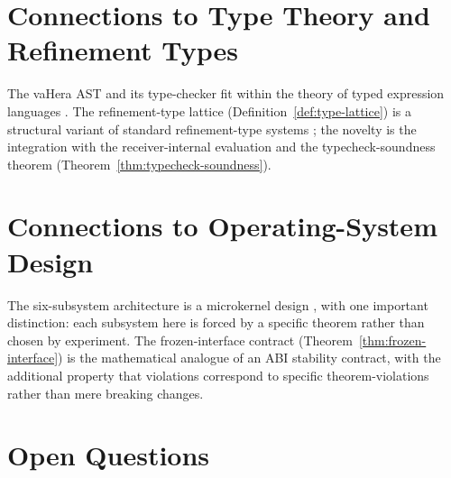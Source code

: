 \documentclass[twocolumn,a4paper]{article}
\begin{document}
\section{Connections to Type Theory and Refinement Types}
\label{sec:type-theory}

The vaHera AST and its type-checker fit within the theory of typed expression languages \citep{pierce2002types,plotkin1977lcf}. The refinement-type lattice (Definition~\ref{def:type-lattice}) is a structural variant of standard refinement-type systems \citep{rondon2008liquid,vazou2014refinement}; the novelty is the integration with the receiver-internal evaluation and the typecheck-soundness theorem (Theorem~\ref{thm:typecheck-soundness}).

\section{Connections to Operating-System Design}
\label{sec:os-design}

The six-subsystem architecture is a microkernel design \citep{liedtke1995microkernel,tanenbaum2014modern}, with one important distinction: each subsystem here is forced by a specific theorem rather than chosen by experiment. The frozen-interface contract (Theorem~\ref{thm:frozen-interface}) is the mathematical analogue of an ABI stability contract, with the additional property that violations correspond to specific theorem-violations rather than mere breaking changes.

\section{Open Questions}
\label{sec:open-questions}
\end{document}
